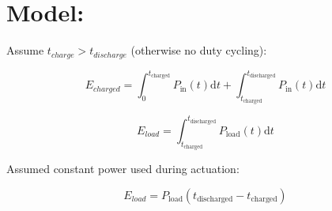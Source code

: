 \documentclass[11pt,twoside,a4paper]{article}
\begin{document}
\section{Model:}


Assume $t_{charge} > t_{discharge}$ (otherwise no duty cycling): 

\begin{equation}
E_{charged} = \int_{0}^{t_{\text{charged}}} P_{\text{in}}(t) \mathrm{d}t + \int_{t_{\text{charged}}}^{t_{\text{discharged}}} P_{\text{in}}(t)  \mathrm{d}t
\end{equation}




\begin{equation}
E_{load} = \int_{t_\text{charged}}^{t_{\text{discharged}}} P_{\text{load}}(t) \mathrm{d}t 
\end{equation}

	
Assumed constant power used during actuation:

\begin{equation}
E_{load} = P_{\text{load}}(t_{\text{discharged}} - t_{\text{charged}})
\end{equation}




\end{document}
